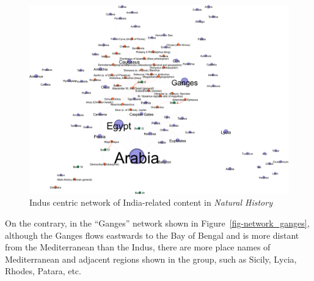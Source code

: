\documentclass[
  12pt,
]{article}
\begin{document}
\begin{figure}

{\centering \includegraphics{NHthesis_structure_files/figure-pdf/fig-network_indus-output-1.png}

}

\caption{\label{fig-network_indus}Indus centric network of India-related
content in \emph{Natural History}}

\end{figure}

On the contrary, in the ``Ganges'' network shown in
Figure~\ref{fig-network_ganges}, although the Ganges flows eastwards to
the Bay of Bengal and is more distant from the Mediterranean than the
Indus, there are more place names of Mediterranean and adjacent regions
shown in the group, such as Sicily, Lycia, Rhodes, Patara, etc.
\end{document}
